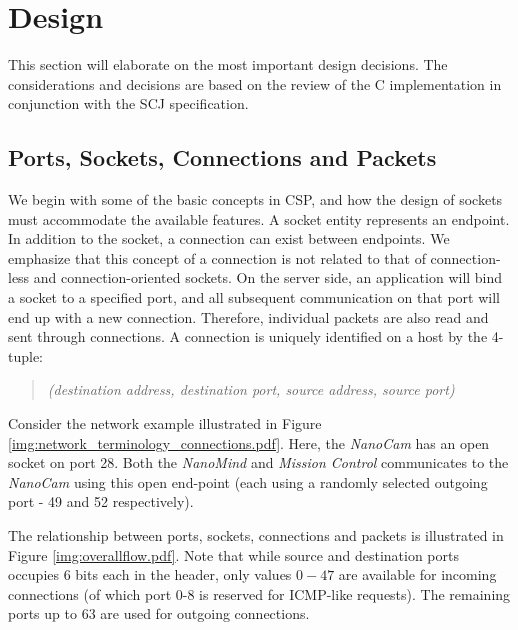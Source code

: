 \section{Design}
This section will elaborate on the most important design decisions. The considerations and decisions are based on the review of the C implementation in conjunction with the SCJ specification.

\subsection{Ports, Sockets, Connections and Packets}
We begin with some of the basic concepts in CSP, and how the design of sockets must accommodate the available features. A socket entity represents an endpoint. In addition to the socket, a connection can exist between endpoints. We emphasize that this concept of a connection is not related to that of connection-less and connection-oriented sockets.  On the server side, an application will bind a socket to a specified port, and all subsequent communication on that port will end up with a new connection. Therefore, individual packets are also read and sent through connections. A connection is uniquely identified on a host by the 4-tuple:
\begin{quotation}
	\emph{(destination address, destination port, source address, source port)}
\end{quotation}

Consider the network example illustrated in Figure \ref{img:network_terminology_connections.pdf}. Here, the \textit{NanoCam} has an open socket on port 28. Both the \textit{NanoMind} and \textit{Mission Control} communicates to the \textit{NanoCam} using this open end-point (each using a randomly selected outgoing port - 49 and 52 respectively). 

The relationship between ports, sockets, connections and packets is illustrated in Figure \ref{img:overallflow.pdf}. Note that while source and destination ports occupies 6 bits each in the header, only values $0-47$ are available for incoming connections (of which port 0-8 is reserved for ICMP-like requests). The remaining ports up to 63 are used for outgoing connections.

